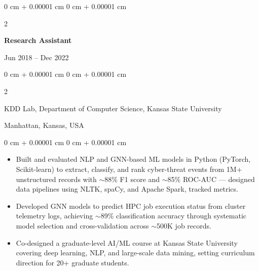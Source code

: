 \documentclass[10pt, letterpaper]{article}
\newenvironment{highlights}{
    \begin{itemize}[
        topsep=0.10 cm,
        parsep=0.10 cm,
        partopsep=0pt,
        itemsep=0pt,
        leftmargin=0 cm + 10pt
    ]
}{
    \end{itemize}
} %
\newenvironment{onecolentry}{
    \begin{adjustwidth}{
        0 cm + 0.00001 cm
    }{
        0 cm + 0.00001 cm
    }
}{
    \end{adjustwidth}
} %
\newenvironment{twocolentry}[2][]{
    \onecolentry
    \def\secondColumn{#2}
    \setcolumnwidth{\fill, 4.5 cm}
    \begin{paracol}{2}
}{
    \switchcolumn \raggedleft \secondColumn
    \end{paracol}
    \endonecolentry
} %
\begin{document}
    \vspace{1mm}

    \begin{twocolentry}{Jun 2018 -- Dec 2022}
        \textbf{Research Assistant}
    \end{twocolentry}
    \begin{twocolentry}{Manhattan, Kansas, USA}
       KDD Lab, Department of Computer Science, Kansas State University
    \end{twocolentry}
    \vspace{0.10 cm}
    \begin{onecolentry}
        \begin{highlights}
            \item Built and evaluated NLP and GNN-based ML models in Python (PyTorch, Scikit-learn) to extract, classify, and rank cyber-threat events from 1M+ unstructured records with $\sim$88\% F1 score and $\sim$85\% ROC-AUC — designed data pipelines using NLTK, spaCy, and Apache Spark, tracked metrics.
            \item Developed GNN models to predict HPC job execution status from cluster telemetry logs, achieving $\sim$89\% classification accuracy through systematic model selection and cross-validation across $\sim$500K job records.
            \item Co-designed a graduate-level AI/ML course at Kansas State University covering deep learning, NLP, and large-scale data mining, setting curriculum direction for 20+ graduate students.
        \end{highlights}
    \end{onecolentry}

    \vspace{0.1 cm}

\end{document}
